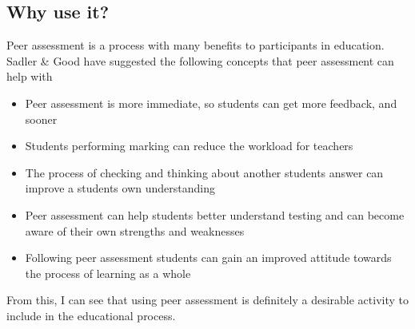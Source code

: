 \documentclass[a4paper,11pt]{report}
\begin{document}
\subsection{Why use it?}
Peer assessment is a process with many benefits to participants in education. Sadler \& Good \cite{sadler_impact_2006} have suggested the following concepts that peer assessment can help with
\begin{itemize}
 \item Peer assessment is more immediate, so students can get more feedback, and sooner
 \item Students performing marking can reduce the workload for teachers
 \item The process of checking and thinking about another students answer can improve a students own understanding \label{sec:peer-test-why}
 \item Peer assessment can help students better understand testing and can become aware of their own strengths and weaknesses
 \item Following peer assessment students can gain an improved attitude towards the process of learning as a whole
\end{itemize}
From this, I can see that using peer assessment is definitely a desirable activity to include in the educational process.\par
\end{document}
